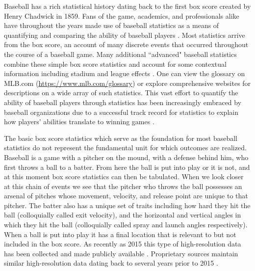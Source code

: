 \documentclass[12pt]{article}
\begin{document}
Baseball has a rich statistical history dating back to the first box score created by Henry Chadwick in 1859. Fans of the game, academics, and professionals alike have throughout the years made use of baseball statistics as a means of quantifying and comparing the ability of baseball players \citep{berry1999bridging, schwarz2004numbers, albert2006pitching, brown2008season, jensen2009hierarchical, jensen2009bayesball, piette2012estimating, baumer2015openwar, marchi2019analyzing}. Most statistics arrive from the box score, an account of many discrete events that occurred throughout the course of a baseball game. Many additional ``advanced" baseball statistics combine these simple box score statistics and account for some contextual information including stadium and league effects \citep{marchi2019analyzing}. One can view the glossary on MLB.com (\url{https://www.mlb.com/glossary}) or explore comprehensive websites \citep{bref, fangraphs, bp} for descriptions on a wide array of such statistics. This vast effort to quantify the ability of baseball players through statistics has been increasingly embraced by baseball organizations due to a successful track record for statistics to explain how players' abilities translate to winning games \citep{lewis2004moneyball}.

The basic box score statistics which serve as the foundation for most baseball statistics do not represent the fundamental unit for which outcomes are realized. Baseball is a game with a pitcher on the mound, with a defense behind him, who first throws a ball to a batter. From here the ball is put into play or it is not, and at this moment box score statistics can then be tabulated. When we look closer at this chain of events we see that the pitcher who throws the ball possesses an arsenal of pitches whose movement, velocity, and release point are unique to that pitcher. The batter also has a unique set of traits including how hard they hit the ball (colloquially called exit velocity), and the horizontal and vertical angles in which they hit the ball (colloquially called spray and launch angles respectively). When a ball is put into play it has a final location that is relevant to but not included in the box score. As recently as 2015 this type of high-resolution data has been collected and made publicly available \citep{statcast}. Proprietary sources maintain similar high-resolution data dating back to several years prior to 2015 \citep{BIS}.
\end{document}
